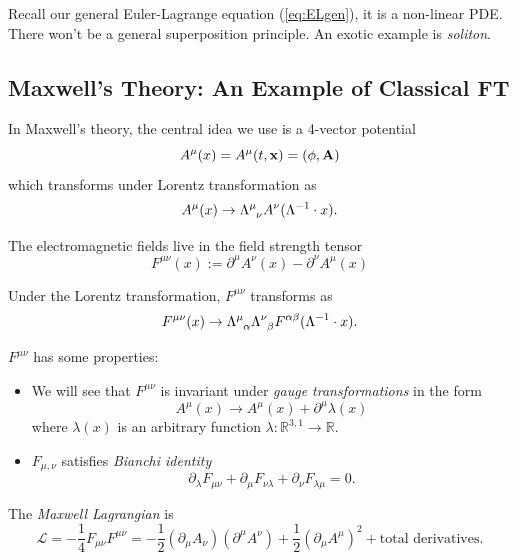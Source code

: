 \documentclass[a4paper,11pt]{article}
\begin{document}
	
	Recall our general Euler-Lagrange equation (\ref{eq:ELgen}), it is a non-linear PDE. There won't be a general superposition principle. An exotic example is \emph{soliton}.
	
	\subsection{Maxwell's Theory: An Example of Classical FT}
	In Maxwell's theory, the central idea we use is a 4-vector potential
	\begin{equation*}
		A^\mu (x) = A^\mu(t, \vb x) = (\phi , \vb A)
	\end{equation*}
	which transforms under Lorentz transformation as 
	\begin{equation}
		A^\mu(x) \to \LT{\mu}{\nu} A^\nu (\Lambda^{-1} \cdot x).
	\end{equation}

	The electromagnetic fields live in the field strength tensor
	\begin{equation}
		F^{\mu\nu}(x) := \partial^\mu A^\nu(x) - \partial^\nu A^\mu(x)
	\end{equation}

	Under the Lorentz transformation, $F^{\mu\nu}$ transforms as 
	\begin{equation}
		F^{\mu\nu}(x) \to \LT{\mu}{\alpha}\LT{\nu}{\beta}F^{\alpha\beta}(\Lambda^{-1} \cdot x).
	\end{equation}

	$F^{\mu\nu}$ has some properties:
	\begin{itemize}
		\item We will see that $F^{\mu\nu}$ is invariant under \emph{gauge transformations} in the form 
		\begin{equation}
			A^\mu(x) \to A^\mu(x) + \partial^\mu \lambda(x)
		\end{equation} 
		where $\lambda(x)$ is an arbitrary function $\lambda : \mathbb{R}^{3,1} \to \mathbb{R}$.
		\item $F_{\mu,\nu}$ satisfies \emph{Bianchi identity}  \begin{equation}
			\partial_\lambda F_{\mu\nu} + \partial_\mu F_{\nu\lambda} + \partial_\nu F_{\lambda\mu} = 0.
		\end{equation}
	\end{itemize}

	The \emph{Maxwell Lagrangian} is 
	\begin{equation}
		\mathcal{L} = - \frac{1}{4} F_{\mu\nu} F^{\mu\nu} = - \frac{1}{2} (\partial_\mu A_\nu)(\partial^\mu A^\nu) + \frac{1}{2} (\partial_\mu A^\mu)^2 + \text{total derivatives}.
	\end{equation}
\end{document}
